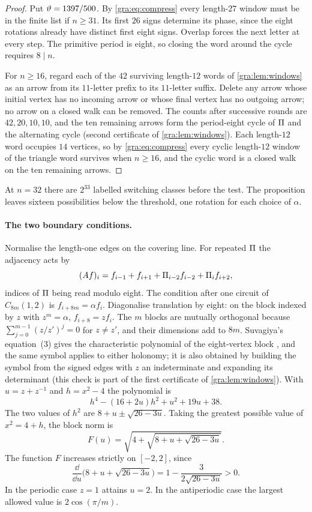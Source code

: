 \begin{proof}
Put $\vartheta=1397/500$. By \eqref{gra:eq:compress} every length-$27$ window
must be in the finite list if $n\ge31$. Its first $26$ signs determine its
phase, since the eight rotations already have distinct first eight signs.
Overlap forces the next letter at every step. The primitive period is
eight, so closing the word around the cycle requires $8\mid n$.

For $n\ge16$, regard each of the $42$ surviving length-$12$ words of
\cref{gra:lem:windows} as an arrow from its $11$-letter prefix to its
$11$-letter suffix. Delete any arrow whose initial vertex has no incoming
arrow or whose final vertex has no outgoing arrow; no arrow on a closed
walk can be removed. The counts after successive rounds are $42,20,10,10$,
and the ten remaining arrows form the period-eight cycle of $\Pi$ and
the alternating cycle (second certificate of \cref{gra:lem:windows}). Each
length-$12$ word occupies $14$ vertices, so by \eqref{gra:eq:compress}
every cyclic length-$12$ window of the triangle word survives when
$n\ge16$, and the cyclic word is a closed walk on the ten remaining arrows.
\end{proof}

At $n=32$ there are $2^{33}$ labelled switching classes before the test.
The proposition leaves sixteen possibilities below the threshold, one
rotation for each choice of $\alpha$.

\paragraph{The two boundary conditions.}
Normalise the length-one edges on the covering line. For repeated $\Pi$
the adjacency acts by
\[
 (Af)_i=f_{i-1}+f_{i+1}+\Pi_{i-2}f_{i-2}+\Pi_if_{i+2},
\]
indices of $\Pi$ being read modulo eight. The condition after one
circuit of $C_{8m}(1,2)$ is $f_{i+8m}=\alpha f_i$. Diagonalise translation
by eight: on the block indexed by $z$ with $z^m=\alpha$, $f_{i+8}=zf_i$.
The $m$ blocks are mutually orthogonal because
$\sum_{j=0}^{m-1}(z/z')^j=0$ for $z\ne z'$, and their dimensions add to
$8m$. Suvagiya's equation~(3) gives the characteristic polynomial of the
eight-vertex block \cite{Suvagiya2026Parity}, and the same symbol applies
to either holonomy; it is also obtained by building the symbol from the
signed edges with $z$ an indeterminate and expanding its determinant (this
check is part of the first certificate of \cref{gra:lem:windows}).
With $u=z+z^{-1}$ and $h=x^2-4$ the polynomial is
\[
 h^4-(16+2u)h^2+u^2+19u+38 .
\]
The two values of $h^2$ are $8+u\pm\sqrt{26-3u}$. Taking the greatest
possible value of $x^2=4+h$, the block norm is
\[
 F(u)=\sqrt{4+\sqrt{8+u+\sqrt{26-3u}}} .
\]
The function $F$ increases strictly on $[-2,2]$, since
\[
 \frac{\dd}{\dd u}\bigl(8+u+\sqrt{26-3u}\bigr)=1-\frac3{2\sqrt{26-3u}}>0 .
\]
In the periodic case $z=1$ attains $u=2$. In the antiperiodic case the
largest allowed value is $2\cos(\pi/m)$.

